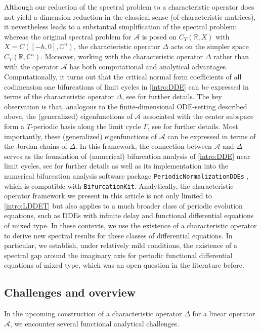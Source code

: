 \documentclass[english]{myarticle}
\begin{document}
\begin{sloppypar}
Although our reduction of the spectral problem to a characteristic operator does not yield a dimension reduction in the classical sense (of characteristic matrices), it nevertheless leads to a substantial simplification of the spectral problem: whereas the original spectral problem for $\mathcal{A}$ is posed on $C_T(\mathbb{R},X)$ with $X = C([-h,0],\mathbb{C}^n)$, the characteristic operator $\Delta$ acts on the simpler space $C_T(\mathbb{R},\mathbb{C}^n)$. Moreover, working with the characteristic operator $\Delta$ rather than with the operator $\mathcal{A}$ has both computational and analytical advantages. Computationally, it turns out that the critical normal form coefficients of all codimension one bifurcations of limit cycles in \eqref{intro:DDE} can be expressed in terms of the characteristic operator $\Delta$, see \cite{Bosschaert2025} for further details. The key observation is that, analogous to the finite-dimensional ODE-setting described above, the (generalized) eigenfunctions of $\mathcal{A}$ associated with the center subspace form a $T$-periodic basis along the limit cycle $\Gamma$, see \cite{Article2} for further details. Most importantly, these (generalized) eigenfunctions of $\mathcal{A}$ can be expressed in terms of the Jordan chains of $\Delta$. In this framework, the connection between $\mathcal{A}$ and $\Delta$ serves as the foundation of (numerical) bifurcation analysis of \eqref{intro:DDE} near limit cycles, see \cite{Bosschaert2025,Article2,Article1} for further details as well as its implementation into the numerical bifurcation analysis software package \verb|PeriodicNormalizationDDEs| \cite{Bosschaert2024c}, which is compatible with \verb|BifurcationKit|. Analytically, the characteristic operator framework we present in this article is not only limited to \eqref{intro:LDDET} but also applies to a much broader class of periodic evolution equations, such as DDEs with infinite delay and functional differential equations of mixed type. In these contexts, we use the existence of a characteristic operator to derive new spectral results for these classes of differential equations. In particular, we establish, under relatively mild conditions, the existence of a spectral gap around the imaginary axis for periodic functional differential equations of mixed type, which was an open question in the literature before.

\subsection{Challenges and overview} 
\label{subsec:aims}
In the upcoming construction of a characteristic operator $\Delta$ for a linear operator $\mathcal{A}$, we encounter several functional analytical challenges.


\end{sloppypar}
\end{document}
